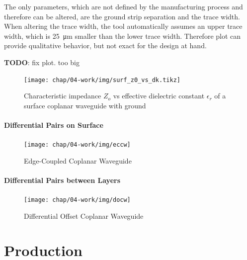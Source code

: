 The only parameters, which are not defined by the manufacturing process and therefore can be altered, are the ground strip separation and the trace width. When altering the trace width, the tool automatically assumes an upper trace width, which is \SI{25}{\micro \meter} smaller than the lower trace width. Therefore plot can provide qualitative behavior, but not exact for the design at hand.

\textbf{TODO}: fix plot. too big

\begin{figure}
	\centering
	\texttt{[image: chap/04-work/img/surf\_z0\_vs\_dk.tikz]}  
	\caption{Characteristic impedance $Z_o$ vs effective dielectric constant $\epsilon_r$ of a surface coplanar waveguide with ground}
	\label{fig:surf_z0_vs_dk}
\end{figure}



 \paragraph{Differential Pairs on Surface}
\begin{figure}[!htbp]
	\centering
	\texttt{[image: chap/04-work/img/eccw]}
	\caption{Edge-Coupled Coplanar Waveguide}
	\label{fig:eccw_geometry}
\end{figure}

\paragraph{Differential Pairs between Layers}
\begin{figure}[!htbp]
	\centering
	\texttt{[image: chap/04-work/img/docw]}
	\caption{Differential Offset Coplanar Waveguide}
	\label{fig:docw}
\end{figure}






\section{Production}